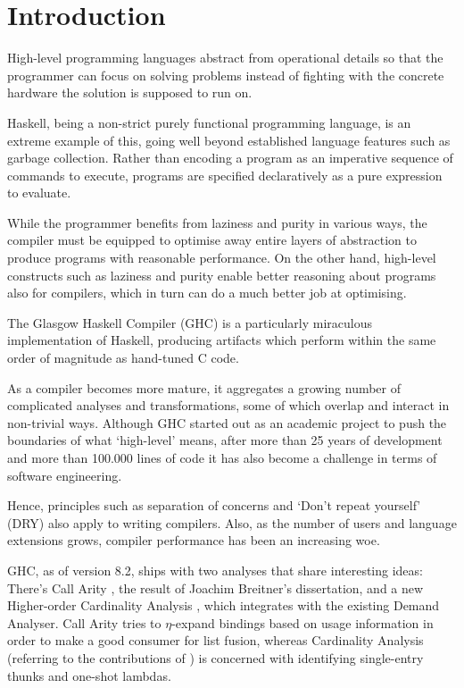 \chapter{Introduction}\label{sec:intro}

High-level programming languages abstract from operational details so that the programmer can focus on solving problems instead of fighting with the concrete hardware the solution is supposed to run on.

Haskell, being a non-strict purely functional programming language, is an extreme example of this, going well beyond established language features such as garbage collection.
Rather than encoding a program as an imperative sequence of commands to execute, programs are specified declaratively as a pure expression to evaluate.

While the programmer benefits from laziness and purity in various ways, the compiler must be equipped to optimise away entire layers of abstraction to produce programs with reasonable performance.
On the other hand, high-level constructs such as laziness and purity enable better reasoning about programs also for compilers, which in turn can do a much better job at optimising.

The Glasgow Haskell Compiler (GHC) is a particularly miraculous implementation of Haskell, producing artifacts which perform within the same order of magnitude as hand-tuned C code.

As a compiler becomes more mature, it aggregates a growing number of complicated analyses and transformations, some of which overlap and interact in non-trivial ways.
Although GHC started out as an academic project to push the boundaries of what `high-level' means, after more than 25 years of development and more than 100.000 lines of code it has also become a challenge in terms of software engineering.

Hence, principles such as separation of concerns and `Don't repeat yourself' (DRY) also apply to writing compilers.
Also, as the number of users and language extensions grows, compiler performance has been an increasing woe.

GHC, as of version 8.2, ships with two analyses that share interesting ideas: 
There's Call Arity \parencite{callarity}, the result of Joachim Breitner's dissertation, and a new Higher-order Cardinality Analysis \parencite{card}, which integrates with the existing Demand Analyser.
Call Arity tries to $\eta$-expand bindings based on usage information in order to make  a good consumer for list fusion, whereas Cardinality Analysis (referring to the contributions of \textcite{card}) is concerned with identifying single-entry thunks and one-shot lambdas.

